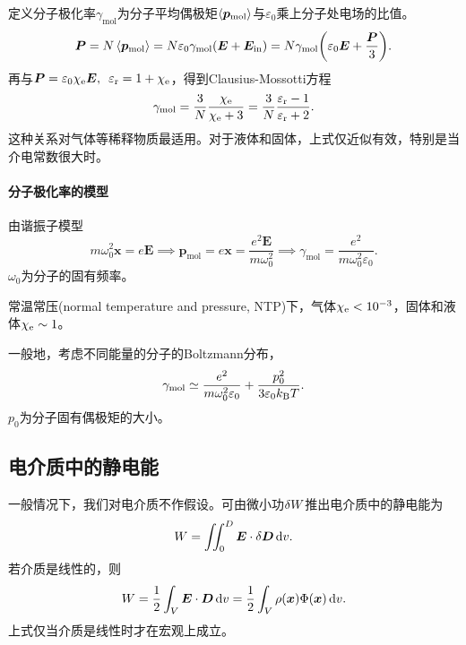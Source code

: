 定义分子极化率$\gamma_\text{mol}$为分子平均偶极矩$\left\langle \bm p_\text{mol}\right\rangle$与$\varepsilon_0$乘上分子处电场的比值。
\[
    \bm P=N\left\langle \bm p_\text{mol}\right\rangle=N\varepsilon_0\gamma_\text{mol}(\bm E+\bm E_\text{in})=N\gamma_\text{mol}\biggl(\varepsilon_0\bm E+\frac{\bm P}3\biggr).
\]
再与$\bm P=\varepsilon_0\chi_\mathrm e\bm E,\enspace\varepsilon_\text r=1+\chi_\mathrm e$，得到Clausius-Mossotti方程
\begin{equation}
    \gamma_\text{mol}=\frac3N\frac{\chi_\mathrm e}{\chi_\mathrm e+3}=\frac3N\frac{\varepsilon_\text r-1}{\varepsilon_\text r+2}.
\end{equation}
这种关系对气体等稀释物质最适用。对于液体和固体，上式仅近似有效，特别是当介电常数很大时。
\paragraph{分子极化率的模型}
由谐振子模型
\[
    m\omega_0^2\bm x=e\bm E\implies\bm p_\text{mol}=e\bm x=\frac{e^2\bm E}{m\omega_0^2}\implies\gamma_\text{mol}=\frac{e^2}{m\omega_0^2\varepsilon_0}.
\]
$\omega_0$为分子的固有频率。

常温常压(normal temperature and pressure, NTP)下，气体$\chi_\mathrm e<10^{-3}$，固体和液体$\chi_\mathrm e\sim 1$。

一般地，考虑不同能量的分子的Boltzmann分布，
\[
    \gamma_\text{mol}\simeq\frac{e^2}{m\omega_0^2\varepsilon_0}+\frac{p_0^2}{3\varepsilon_0k_{\mathrm B} T}.
\]
$p_0$为分子固有偶极矩的大小。

\subsection{电介质中的静电能}
\label{ssec:electrostatic energy in dielectric media}

一般情况下，我们对电介质不作假设。可由微小功$\mathop{}\!\delta W$推出电介质中的静电能为
\[
    W=\iint_0^D\bm E\cdot\mathop{}\!\delta\bm D\mathop{}\!\mathrm{d} v.
\]
若介质是线性的，则
\begin{equation}
    W=\frac12\int_V\bm E\cdot\bm D\mathop{}\!\mathrm{d} v=\frac12\int_V\rho(\bm x)\Phi(\bm x)\mathop{}\!\mathrm{d} v.
\end{equation}
上式仅当介质是线性时才在宏观上成立。
